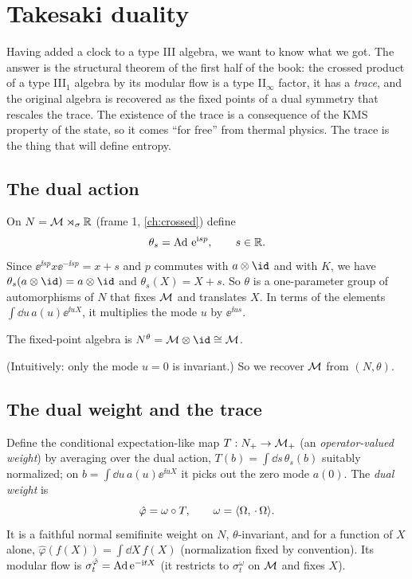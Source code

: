 \section{Takesaki duality}\label{ch:takesaki}

\begin{physmotiv}
Having added a clock to a type III algebra, we want to know what we got. The answer is the structural theorem of the first half of the book: the crossed product of a type III$_1$ algebra by its modular flow is a type II$_\infty$ factor, it has a \emph{trace}, and the original algebra is recovered as the fixed points of a dual symmetry that rescales the trace. The existence of the trace is a consequence of the KMS property of the state, so it comes ``for free'' from thermal physics. The trace is the thing that will define entropy.
\end{physmotiv}

\subsection{The dual action}

On $N=\mathcal{M}\rtimes_\sigma\mathbb{R}$ (frame 1, \cref{ch:crossed}) define
\begin{equation}
\theta_s=\operatorname{Ad}\,\mathrm{e}^{\mathrm{i} sp},\qquad s\in\mathbb{R}.
\end{equation}
Since $\ee^{\ii sp}x\ee^{-\ii sp}=x+s$ and $p$ commutes with $a\otimes\id$ and with $K$, we have $\theta_s(a\otimes\id)=a\otimes\id$ and $\theta_s(X)=X+s$. So $\theta$ is a one-parameter group of automorphisms of $N$ that fixes $\mathcal{M}$ and translates $X$. In terms of the elements $\int\dd u\,a(u)\ee^{\ii uX}$, it multiplies the mode $u$ by $\ee^{\ii us}$.

\begin{proposition}
The fixed-point algebra is $N^\theta=\M\otimes\id\cong\M$.
\end{proposition}
(Intuitively: only the mode $u=0$ is invariant.) So we recover $\mathcal{M}$ from $(N,\theta)$.

\subsection{The dual weight and the trace}

Define the conditional expectation-like map $T:N_+\to\mathcal{M}_+$ (an \emph{operator-valued weight}) by averaging over the dual action, $T(b)=\int\dd s\,\theta_s(b)$ suitably normalized; on $b=\int\dd u\,a(u)\ee^{\ii uX}$ it picks out the zero mode $a(0)$. The \emph{dual weight} is
\begin{equation}
\hat\varphi=\omega\circ T,\qquad\omega=\langle \Omega,\,\cdot\,\Omega\rangle.
\end{equation}
It is a faithful normal semifinite weight on $N$, $\theta$-invariant, and for a function of $X$ alone, $\hat\varphi(f(X))=\int\dd X\,f(X)$ (normalization fixed by convention). Its modular flow is $\sigma^{\hat\varphi}_t=\operatorname{Ad}\mathrm{e}^{-\mathrm{i} tX}$ (it restricts to $\sigma^\omega_t$ on $\mathcal{M}$ and fixes $X$).

